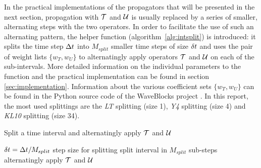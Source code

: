 %
In the practical implementations of the propagators that will be presented in the next section, propagation with $\mathcal{T}$ and $\mathcal{U}$ is usually replaced by a series of smaller, alternating steps with the two operators.
In order to facilitate the use of such an alternating pattern, the helper function  (algorithm~\ref{alg:intsplit}) is introduced:
it splits the time step $\Delta t$ into $M_{split}$ smaller time steps of size $\delta t$ and uses the pair of weight lists $\{ w_T, w_U \}$ to alternatingly apply operators $\mathcal{T}$ and $\mathcal{U}$ on each of the sub-intervals.
More detailed information on the individual parameters to the  function and the practical implementation can be found in section \ref{sec:implementation}.
Information about the various coefficient sets $\{w_T, w_U\}$ can be found in the Python source code of the WaveBlocks project \cite{libwaveblocks}.
In this report, the most used splittings are the \emph{LT} splitting (size 1), \emph{Y4} splitting (size 4) and \emph{KL10} splitting (size 34).
%
\begin{algorithm}[ht]
	\caption{Split a time interval and alternatingly apply $\mathcal{T}$ and $\mathcal{U}$}
	\label{alg:intsplit}
	\begin{algorithmic}
		\State
			\State
			\State $\delta t = \Delta t/M_{split}$
			\Comment step size for splitting
			\Comment split interval in $M_{split}$ sub-steps
				\Comment alternatingly apply $\mathcal{T}$ and $\mathcal{U}$
					\State {}
					\State {}
				\EndFor
			\EndFor
		\State
		\EndProcedure
	\end{algorithmic}
\end{algorithm}


